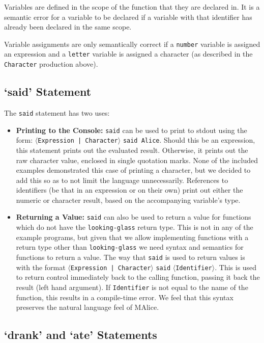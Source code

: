 \documentclass[a4wide, 11pt]{article}
\begin{document}
Variables are defined in the scope of the function that they are declared in. It is a semantic error for a variable to be declared if a variable with that identifier has already been declared in the same scope.

Variable assignments are only semantically correct if a \texttt{number} variable is assigned an expression and a \texttt{letter} variable is assigned a character (as described in the \texttt{Character} production above).

\subsection{`said' Statement}

The \texttt{said} statement has two uses:
\begin{itemize}
\item \textbf{Printing to the Console:} \texttt{said} can be used to print to stdout using the form: $\langle$\texttt{Expression | Character}$\rangle$ \texttt{said Alice}. Should this be an expression, this statement prints out the evaluated result. Otherwise, it prints out the raw character value, enclosed in single quotation marks. None of the included examples demonstrated this case of printing a character, but we decided to add this so as to not limit the language unnecessarily. References to identifiers (be that in an expression or on their own) print out either the numeric or character result, based on the accompanying variable's type.
\item \textbf{Returning a Value:} \texttt{said} can also be used to return a value for functions which do not have the \texttt{looking-glass} return type. This is not in any of the example programs, but given that we allow implementing functions with a return type other than \texttt{looking-glass} we need syntax and semantics for functions to return a value. The way that \texttt{said} is used to return values is with the format $\langle$\texttt{Expression | Character}$\rangle$ \texttt{said} $\langle$\texttt{Identifier}$\rangle$. This is used to return control immediately back to the calling function, passing it back the result (left hand argument). If \texttt{Identifier} is not equal to the name of the function, this results in a compile-time error. We feel that this syntax preserves the natural language feel of MAlice.
\end{itemize}

\subsection{`drank' and `ate' Statements}
\end{document}

